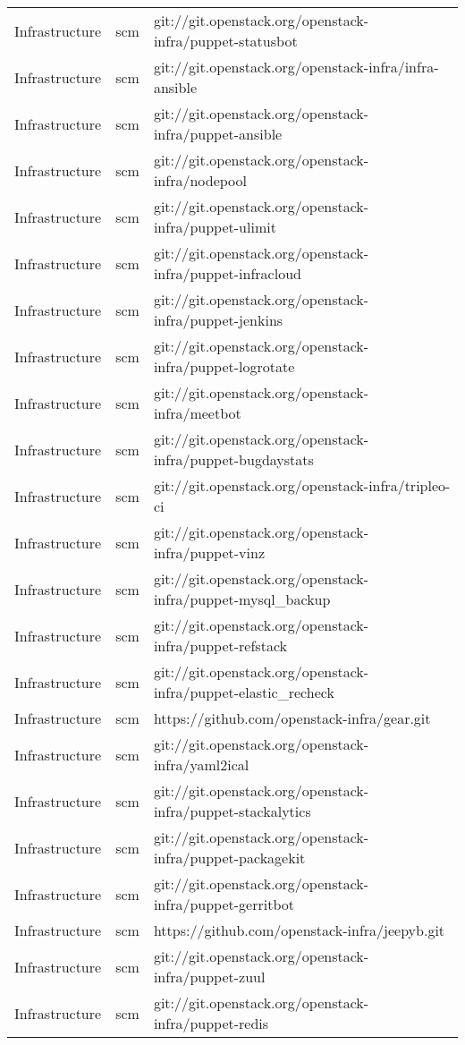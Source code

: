 \begin{center}
\begin{longtable}{|p{4cm}|p{1cm}|p{10cm}|}
Infrastructure&scm&git://git.openstack.org/openstack-infra/puppet-statusbot\\ 
Infrastructure&scm&git://git.openstack.org/openstack-infra/infra-ansible\\ 
Infrastructure&scm&git://git.openstack.org/openstack-infra/puppet-ansible\\ 
Infrastructure&scm&git://git.openstack.org/openstack-infra/nodepool\\ 
Infrastructure&scm&git://git.openstack.org/openstack-infra/puppet-ulimit\\ 
Infrastructure&scm&git://git.openstack.org/openstack-infra/puppet-infracloud\\ 
Infrastructure&scm&git://git.openstack.org/openstack-infra/puppet-jenkins\\ 
Infrastructure&scm&git://git.openstack.org/openstack-infra/puppet-logrotate\\ 
Infrastructure&scm&git://git.openstack.org/openstack-infra/meetbot\\ 
Infrastructure&scm&git://git.openstack.org/openstack-infra/puppet-bugdaystats\\ 
Infrastructure&scm&git://git.openstack.org/openstack-infra/tripleo-ci\\ 
Infrastructure&scm&git://git.openstack.org/openstack-infra/puppet-vinz\\ 
Infrastructure&scm&git://git.openstack.org/openstack-infra/puppet-mysql\_backup\\ 
Infrastructure&scm&git://git.openstack.org/openstack-infra/puppet-refstack\\ 
Infrastructure&scm&git://git.openstack.org/openstack-infra/puppet-elastic\_recheck\\ 
Infrastructure&scm&https://github.com/openstack-infra/gear.git\\ 
Infrastructure&scm&git://git.openstack.org/openstack-infra/yaml2ical\\ 
Infrastructure&scm&git://git.openstack.org/openstack-infra/puppet-stackalytics\\ 
Infrastructure&scm&git://git.openstack.org/openstack-infra/puppet-packagekit\\ 
Infrastructure&scm&git://git.openstack.org/openstack-infra/puppet-gerritbot\\ 
Infrastructure&scm&https://github.com/openstack-infra/jeepyb.git\\ 
Infrastructure&scm&git://git.openstack.org/openstack-infra/puppet-zuul\\ 
Infrastructure&scm&git://git.openstack.org/openstack-infra/puppet-redis\\ 

\end{longtable}
\end{center}

